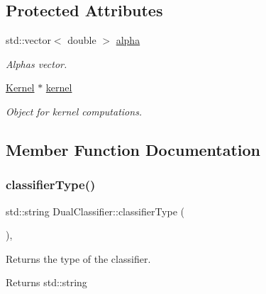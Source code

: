 \subsection*{Protected Attributes}
\begin{DoxyCompactItemize}
\item 
\mbox{\label{class_dual_classifier_a0ed1219ed410852620b844934a8c70a0}} 
std\+::vector$<$ double $>$ \hyperlink{class_dual_classifier_a0ed1219ed410852620b844934a8c70a0}{alpha}
\begin{DoxyCompactList}\small\item\em Alphas vector. \end{DoxyCompactList}\item 
\mbox{\label{class_dual_classifier_ae9366ad5c46f618a8a6e62f99a19c84f}} 
\hyperlink{class_kernel}{Kernel} $\ast$ \hyperlink{class_dual_classifier_ae9366ad5c46f618a8a6e62f99a19c84f}{kernel}
\begin{DoxyCompactList}\small\item\em Object for kernel computations. \end{DoxyCompactList}\end{DoxyCompactItemize}


\subsection{Member Function Documentation}
\mbox{\label{class_dual_classifier_afbede25a3e30b87503c0c6555d52f358}} 
\subsubsection{\texorpdfstring{classifier\+Type()}{classifierType()}}
{\footnotesize\ttfamily std\+::string Dual\+Classifier\+::classifier\+Type (\begin{DoxyParamCaption}{ }\end{DoxyParamCaption})\hspace{0.3cm}{\ttfamily [inline]}, {\ttfamily [virtual]}}



Returns the type of the classifier. 

\begin{DoxyReturn}{Returns}
std\+::string 
\end{DoxyReturn}


